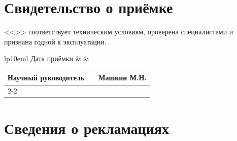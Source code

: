 \documentclass[14pt,a4paper,final]{extreport}
\begin{document}
\newpage

\chapter{Свидетельство о приёмке}

<<\doctitleoneline>>
cоответствует техническим условиям, проверена специалистами и признана годной к эксплуатации.


\begin{minipage}{0.9\linewidth}
	
	\vspace{15cm plus 1mm minus 1mm}
	
	
	\end{minipage}
	\begin{flushleft} 

\begin{tabular}{lp{10em}l} 
	Дата приёмки & \hspace{10cm}  &\\
\end{tabular}
\begin{minipage}{0.9\linewidth}
	
	\vspace{3cm plus 1mm minus 1mm}
	
	
	\end{minipage}
	\begin{tabular}{lp{10em}l} 
Научный руководитель & \hspace{10cm}  & Машкин М.Н.\\
\cline{2-2}   
\end{tabular}


\end{flushleft}

\newpage

\chapter{Сведения о рекламациях}
\end{document}
